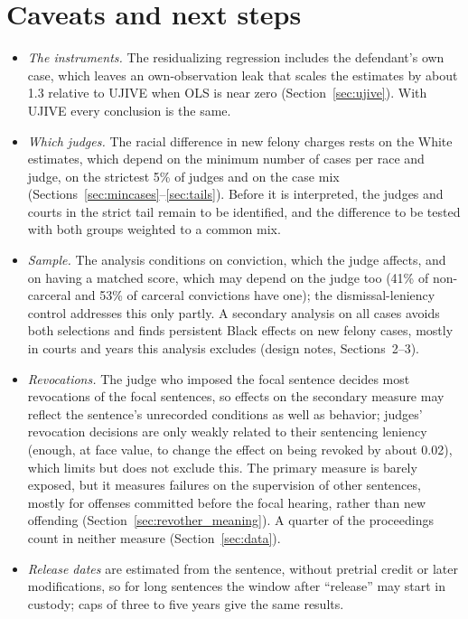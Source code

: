 \documentclass[11pt]{article}
\begin{document}
\section{Caveats and next steps}\label{sec:caveats}
\begin{itemize}
  \item \emph{The instruments.} The residualizing regression includes the defendant's own case, which leaves an own-observation leak that scales the estimates by about 1.3 relative to UJIVE when OLS is near zero (Section~\ref{sec:ujive}). With UJIVE every conclusion is the same.
  \item \emph{Which judges.} The racial difference in new felony charges rests on the White estimates, which depend on the minimum number of cases per race and judge, on the strictest 5\% of judges and on the case mix (Sections~\ref{sec:mincases}--\ref{sec:tails}). Before it is interpreted, the judges and courts in the strict tail remain to be identified, and the difference to be tested with both groups weighted to a common mix.
  \item \emph{Sample.} The analysis conditions on conviction, which the judge affects, and on having a matched score, which may depend on the judge too (41\% of non-carceral and 53\% of carceral convictions have one); the dismissal-leniency control addresses this only partly. A secondary analysis on all cases avoids both selections and finds persistent Black effects on new felony cases, mostly in courts and years this analysis excludes (design notes, Sections~2--3).
  \item \emph{Revocations.} The judge who imposed the focal sentence decides most revocations of the focal sentences, so effects on the secondary measure may reflect the sentence's unrecorded conditions as well as behavior; judges' revocation decisions are only weakly related to their sentencing leniency (enough, at face value, to change the effect on being revoked by about 0.02), which limits but does not exclude this. The primary measure is barely exposed, but it measures failures on the supervision of other sentences, mostly for offenses committed before the focal hearing, rather than new offending (Section~\ref{sec:revother_meaning}). A quarter of the proceedings count in neither measure (Section~\ref{sec:data}).
  \item \emph{Release dates} are estimated from the sentence, without pretrial credit or later modifications, so for long sentences the window after ``release'' may start in custody; caps of three to five years give the same results.

\end{itemize}
\end{document}

